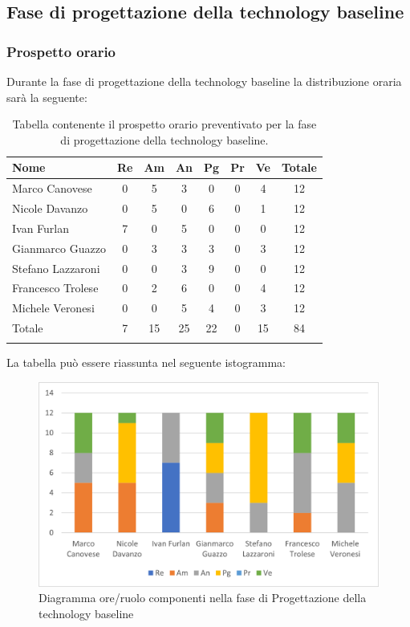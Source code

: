 			\subsection{Fase di progettazione della technology baseline}
            \subsubsection{Prospetto orario}
			Durante la fase di progettazione della technology baseline la distribuzione oraria sarà la seguente:
			
			\begin{longtable}{|l|c|c|c|c|c|c|c|}
				\hline
				\rowcolor{lighter-grayer}
				\textbf{Nome} & \textbf{Re} & \textbf{Am} & \textbf{An} & \textbf{Pg}  & \textbf{Pr}   & \textbf{Ve} & \textbf{Totale} \\
				\hline
				\endfirsthead
				
				\hline
				Marco Canovese & 0 & 5 & 3 & 0 & 0 & 4 & 12\\
				\hline
				\hline
				Nicole Davanzo & 0 & 5 & 0 & 6 & 0 & 1 & 12\\
				\hline
				\hline
				Ivan Furlan & 7 & 0 & 5 & 0 & 0 & 0 & 12\\
				\hline
				\hline
				Gianmarco Guazzo & 0 & 3 & 3 & 3 & 0 & 3 & 12\\
				\hline
				\hline
				Stefano Lazzaroni & 0 & 0 & 3 & 9 & 0 & 0 & 12\\
				\hline
				\hline
				Francesco Trolese & 0 & 2 & 6 & 0 & 0 & 4 & 12\\
				\hline
				\hline
				Michele Veronesi & 0 & 0 & 5 & 4 & 0 & 3 & 12\\
				\hline 
				\hline
				Totale & 7 & 15 & 25 & 22 & 0 & 15 & 84\\
				\hline 
				\rowcolor{white}
				\caption{Tabella contenente il prospetto orario preventivato per la fase di progettazione della technology baseline.}
			\end{longtable}

		
			La tabella può essere riassunta nel seguente istogramma:
		
			\begin{figure}[H]
				\centering
				\includegraphics[width=0.8\linewidth]{res/images/preventivo/3-1.png}
				\caption{Diagramma ore/ruolo componenti nella fase di Progettazione della technology baseline }
				\label{fig:diagramma suddivisione ruoli fase progettazione della technology baseline}
			\end{figure}
		
